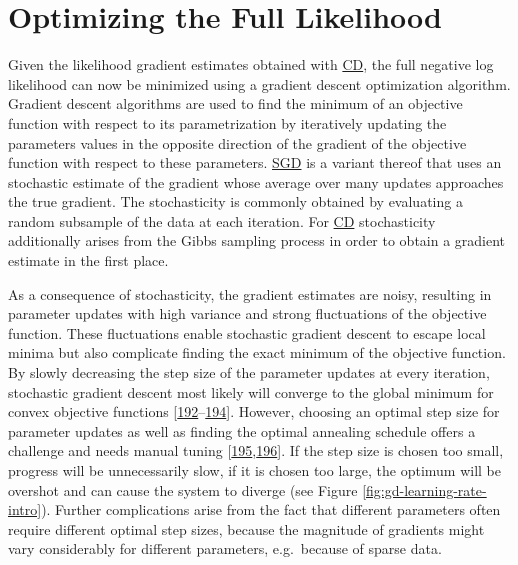 \documentclass[11pt,a4paper,twoside]{book}
\theoremstyle{definition}
\theoremstyle{definition}
\theoremstyle{remark}
\begin{document}
\section{Optimizing the Full
Likelihood}\label{full-likelihood-optimization}

Given the likelihood gradient estimates obtained with
\protect\hyperlink{abbrev}{CD}, the full negative log likelihood can now
be minimized using a gradient descent optimization algorithm. Gradient
descent algorithms are used to find the minimum of an objective function
with respect to its parametrization by iteratively updating the
parameters values in the opposite direction of the gradient of the
objective function with respect to these parameters.
\protect\hyperlink{abbrev}{SGD} is a variant thereof that uses an
stochastic estimate of the gradient whose average over many updates
approaches the true gradient. The stochasticity is commonly obtained by
evaluating a random subsample of the data at each iteration. For
\protect\hyperlink{abbrev}{CD} stochasticity additionally arises from
the Gibbs sampling process in order to obtain a gradient estimate in the
first place.

As a consequence of stochasticity, the gradient estimates are noisy,
resulting in parameter updates with high variance and strong
fluctuations of the objective function. These fluctuations enable
stochastic gradient descent to escape local minima but also complicate
finding the exact minimum of the objective function. By slowly
decreasing the step size of the parameter updates at every iteration,
stochastic gradient descent most likely will converge to the global
minimum for convex objective functions
{[}\protect\hyperlink{ref-Ruder2017}{192}--\protect\hyperlink{ref-Bottou2010}{194}{]}.
However, choosing an optimal step size for parameter updates as well as
finding the optimal annealing schedule offers a challenge and needs
manual tuning
{[}\protect\hyperlink{ref-Schaul2013}{195},\protect\hyperlink{ref-Zeiler2012}{196}{]}.
If the step size is chosen too small, progress will be unnecessarily
slow, if it is chosen too large, the optimum will be overshot and can
cause the system to diverge (see Figure
\ref{fig:gd-learning-rate-intro}). Further complications arise from the
fact that different parameters often require different optimal step
sizes, because the magnitude of gradients might vary considerably for
different parameters, e.g.~because of sparse data.
\end{document}
